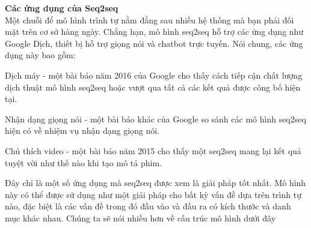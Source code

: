 \textbf{Các ứng dụng của Seq2seq} \\[0.2em]
Một chuỗi để mô hình trình tự nằm đằng sau nhiều hệ thống mà bạn phải đối mặt trên cơ sở hàng ngày. Chẳng hạn, mô hình seq2seq hỗ trợ các ứng dụng như Google Dịch, thiết bị hỗ trợ giọng nói và chatbot trực tuyến. Nói chung, các ứng dụng này bao gồm:

Dịch máy - một bài báo năm 2016 của Google cho thấy cách tiếp cận chất lượng dịch thuật mô hình seq2seq hoặc vượt qua tất cả các kết quả được công bố hiện tại.

Nhận dạng giọng nói - một bài báo khác của Google so sánh các mô hình seq2seq hiện có về nhiệm vụ nhận dạng giọng nói.

Chú thích video - một bài báo năm 2015 cho thấy một seq2seq mang lại kết quả tuyệt vời như thế nào khi tạo mô tả phim.

Đây chỉ là một số ứng dụng mà seq2seq được xem là giải pháp tốt nhất. Mô hình này có thể được sử dụng như một giải pháp cho bất kỳ vấn đề dựa trên trình tự nào, đặc biệt là các vấn đề trong đó đầu vào và đầu ra có kích thước và danh mục khác nhau. Chúng ta sẽ nói nhiều hơn về cấu trúc mô hình dưới đây